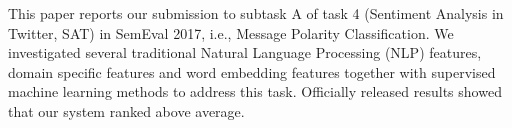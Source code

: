 This paper reports our submission to subtask A of task 4 (Sentiment Analysis in Twitter, SAT) in SemEval 2017, i.e., Message Polarity Classification. We investigated several traditional Natural Language Processing (NLP) features, domain specific features and word embedding features together with supervised machine learning methods to address this task. Officially released results showed that our system ranked above average.
